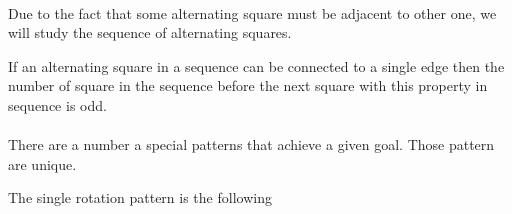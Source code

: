\paragraph{}
Due to the fact that some alternating square must be adjacent to other one, we will study the sequence of alternating squares.

\begin{corollary}
  \label{parity-sequence-squares}
  If an alternating square in a sequence can be connected to a single edge then the number of square in the sequence before the next square with this property in sequence is odd.
\end{corollary}

\paragraph{}
There are a number a special patterns that achieve a given goal. Those pattern are unique.

\begin{proposition}
  \label{rotation-pattern}
  The single rotation pattern is the following

  \begin{figure}[H]
    \begin{center}
      \caption{}
    \end{center}
  \end{figure}

\end{proposition}

